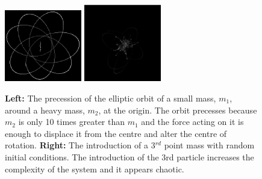 \documentclass[10pt,a4paper]{article}
\begin{document}
\begin{figure}[h!]
\begin{center}
\includegraphics[width =0.3\textwidth]{orbit.eps}
\includegraphics[width =0.3\textwidth]{2Nptrace.eps}
\caption{\textbf{Left: }The precession of the elliptic orbit of a small mass, $m_1$, around a heavy mass, $m_2$, at the origin. The orbit precesses because $m_2$ is only 10 times greater than $m_1$ and the force acting on it is enough to displace it from the centre and alter the centre of rotation. \textbf{Right: }The introduction of a 3$^{rd}$ point mass with random initial conditions. The introduction of the 3rd particle increases the complexity of the system and it appears chaotic. }
\label{fig:unstableOrbits}
\end{center}
\end{figure}



\newpage
\end{document}
